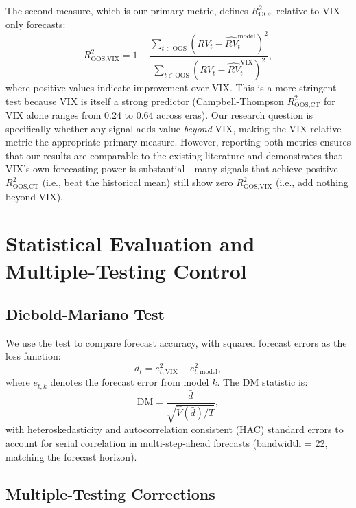 \documentclass[12pt,a4paper]{article}
\begin{document}
The second measure, which is our primary metric, defines $R^2_{\text{OOS}}$ relative to VIX-only forecasts:
\begin{equation}
R^2_{\text{OOS,VIX}} = 1 - \frac{\sum_{t \in \text{OOS}} (RV_t - \hat{RV}_t^{\text{model}})^2}{\sum_{t \in \text{OOS}} (RV_t - \hat{RV}_t^{\text{VIX}})^2},
\label{eq:oos_r2}
\end{equation}
where positive values indicate improvement over VIX. This is a more stringent test because VIX is itself a strong predictor (Campbell-Thompson $R^2_{\text{OOS,CT}}$ for VIX alone ranges from 0.24 to 0.64 across eras). Our research question is specifically whether any signal adds value \emph{beyond} VIX, making the VIX-relative metric the appropriate primary measure. However, reporting both metrics ensures that our results are comparable to the existing literature and demonstrates that VIX's own forecasting power is substantial---many signals that achieve positive $R^2_{\text{OOS,CT}}$ (i.e., beat the historical mean) still show zero $R^2_{\text{OOS,VIX}}$ (i.e., add nothing beyond VIX).


\section{Statistical Evaluation and Multiple-Testing Control}
\label{sec:evaluation}

\subsection{Diebold-Mariano Test}

We use the \citet{diebold1995} test to compare forecast accuracy, with squared forecast errors as the loss function:
\begin{equation}
d_t = e_{t,\text{VIX}}^2 - e_{t,\text{model}}^2,
\label{eq:dm}
\end{equation}
where $e_{t,k}$ denotes the forecast error from model $k$. The DM statistic is:
\begin{equation}
\text{DM} = \frac{\bar{d}}{\sqrt{\hat{V}(\bar{d})/T}},
\label{eq:dm_stat}
\end{equation}
with \citet{newey1987} heteroskedasticity and autocorrelation consistent (HAC) standard errors to account for serial correlation in multi-step-ahead forecasts (bandwidth = 22, matching the forecast horizon).

\subsection{Multiple-Testing Corrections}
\label{sec:multiple_testing}
\end{document}
